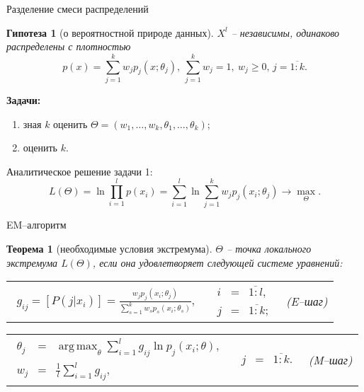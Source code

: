 \documentclass[unicode, notheorems, pdf]{beamer}
\DeclareMathOperator*{\argmax}{arg\,\max}
\newtheorem{theorem}{Теорема}
\newtheorem{hypotesys}{Гипотеза}
\begin{document}
%
\title[Разделение смеси распределений]{}
%
\begin{frame}{Разделение смеси распределений}
	\begin{hypotesys}[о вероятностной природе данных]
		$X^l$ -- независимы, одинаково распределены с плотностью
		\[p(x) = \sum_{j=1}^k w_j p_j(x;\theta_j),\:\sum_{j=1}^k w_j=1,\:w_j\ge0,\,j=\overline{1:k}.\]
	\end{hypotesys}

	\pause
	\vspace{.25cm}
	{\bf Задачи:}
	\begin{enumerate}
		\item зная $k$ оценить $\Theta=(w_1,\dots,w_k,\theta_1,\dots,\theta_k)$;
		\item оценить $k$.
	\end{enumerate}

	\pause
	\vspace{.25cm}
	Аналитическое решение задачи 1:
	\[L(\Theta)=\ln\prod_{i=1}^lp(x_i)=\sum_{i=1}^l\ln\sum_{j=1}^kw_jp_j(x_i;\theta_j)\to\max_\Theta.\]
\end{frame}

\begin{frame}{EM--алгоритм}
	\begin{theorem}[необходимые условия экстремума]
		$\Theta$ -- точка локального экстремума $L(\Theta)$, если она удовлетворяет следующей системе уравнений:
		
		\setlength\arraycolsep{2pt}
		\begin{tabular}{c c c}
			\parbox{0.54\textwidth}{
			\begin{eqnarray*}
				g_{ij}=\left[P(j|x_i)\right]=\frac{w_jp_j(x_i;\theta_j)}{\displaystyle\sum_{s=1}^kw_sp_s(x_i;\theta_s)},
			\end{eqnarray*}} &
			\parbox{0.15\textwidth}{
			\begin{eqnarray*}
				i&=&\overline{1:l},\\
				j&=&\overline{1:k};
			\end{eqnarray*}
			} & 
			(E--шаг)
			\end{tabular}
			\begin{tabular}{c c c}
			\parbox{0.44\textwidth}{
			\begin{eqnarray*}
				\theta_j&=&\argmax_{\theta}\sum_{i=1}^lg_{ij}\ln p_j(x_i;\theta),\\
				w_j&=&\frac{1}{l}\sum_{i=1}^lg_{ij},
			\end{eqnarray*}} &
			\parbox{0.25\textwidth}{
			\begin{eqnarray*}
				j&=&\overline{1:k}.
			\end{eqnarray*}} &
			(M--шаг)
		\end{tabular}
	\end{theorem}
\end{frame}
\end{document}
